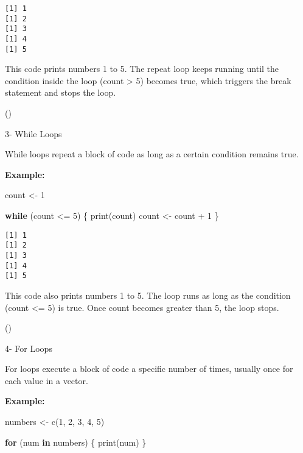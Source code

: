 \documentclass[
  man,
  floatsintext,
  longtable,
  nolmodern,
  notxfonts,
  notimes,
  colorlinks=true,linkcolor=blue,citecolor=blue,urlcolor=blue]{apa7}
\newenvironment{Shaded}{\begin{snugshade}}{\end{snugshade}}
\newcommand{\ControlFlowTok}[1]{\textcolor[rgb]{0.00,0.23,0.31}{\textbf{#1}}}
\newcommand{\DecValTok}[1]{\textcolor[rgb]{0.68,0.00,0.00}{#1}}
\newcommand{\FunctionTok}[1]{\textcolor[rgb]{0.28,0.35,0.67}{#1}}
\newcommand{\NormalTok}[1]{\textcolor[rgb]{0.00,0.23,0.31}{#1}}
\newcommand{\OtherTok}[1]{\textcolor[rgb]{0.00,0.23,0.31}{#1}}
\newcommand{\SpecialCharTok}[1]{\textcolor[rgb]{0.37,0.37,0.37}{#1}}
\begin{document}
\begin{verbatim}
[1] 1
[1] 2
[1] 3
[1] 4
[1] 5
\end{verbatim}

This code prints numbers 1 to 5. The repeat loop keeps running until the
condition inside the loop (count \textgreater{} 5) becomes true, which
triggers the break statement and stops the loop.

()

3- While Loops

While loops repeat a block of code as long as a certain condition
remains true.

\textbf{Example:}

\begin{Shaded}
\begin{Highlighting}[]
\NormalTok{count }\OtherTok{\textless{}{-}} \DecValTok{1}

\ControlFlowTok{while}\NormalTok{ (count }\SpecialCharTok{\textless{}=} \DecValTok{5}\NormalTok{) \{}
  \FunctionTok{print}\NormalTok{(count)}
\NormalTok{  count }\OtherTok{\textless{}{-}}\NormalTok{ count }\SpecialCharTok{+} \DecValTok{1}
\NormalTok{\}}
\end{Highlighting}
\end{Shaded}

\begin{verbatim}
[1] 1
[1] 2
[1] 3
[1] 4
[1] 5
\end{verbatim}

This code also prints numbers 1 to 5. The loop runs as long as the
condition (count \textless= 5) is true. Once count becomes greater than
5, the loop stops.

()

4- For Loops

For loops execute a block of code a specific number of times, usually
once for each value in a vector.

\textbf{Example:}

\begin{Shaded}
\begin{Highlighting}[]
\NormalTok{numbers }\OtherTok{\textless{}{-}} \FunctionTok{c}\NormalTok{(}\DecValTok{1}\NormalTok{, }\DecValTok{2}\NormalTok{, }\DecValTok{3}\NormalTok{, }\DecValTok{4}\NormalTok{, }\DecValTok{5}\NormalTok{)}

\ControlFlowTok{for}\NormalTok{ (num }\ControlFlowTok{in}\NormalTok{ numbers) \{}
  \FunctionTok{print}\NormalTok{(num)}
\NormalTok{\}}
\end{Highlighting}
\end{Shaded}
\end{document}

